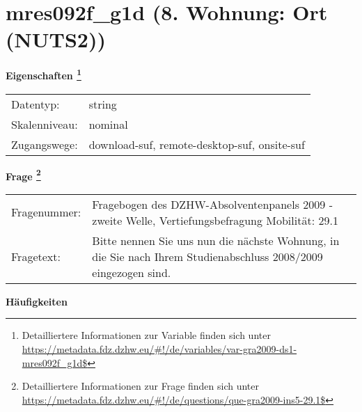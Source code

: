 
    \setcounter{footnote}{0}

    \vspace*{-1.8cm}
	\section{mres092f\_g1d (8. Wohnung: Ort (NUTS2))}
	\label{section:mres092f_g1d}



    \vspace*{0.5cm}
    \noindent\textbf{Eigenschaften
	\footnote{Detailliertere Informationen zur Variable finden sich unter
		\url{https://metadata.fdz.dzhw.eu/\#!/de/variables/var-gra2009-ds1-mres092f_g1d$}}}\\
	\begin{tabularx}{\hsize}{@{}lX}
	Datentyp: & string \\
	Skalenniveau: & nominal \\
	Zugangswege: &
	  download-suf, 
	  remote-desktop-suf, 
	  onsite-suf
 \\
    \end{tabularx}



				\vspace*{0.5cm}
                \noindent\textbf{Frage
	                \footnote{Detailliertere Informationen zur Frage finden sich unter
		              \url{https://metadata.fdz.dzhw.eu/\#!/de/questions/que-gra2009-ins5-29.1$}}}\\
				\begin{tabularx}{\hsize}{@{}lX}
					Fragenummer: &
					  Fragebogen des DZHW-Absolventenpanels 2009 - zweite Welle, Vertiefungsbefragung Mobilität:
					  29.1
 \\
					Fragetext: & Bitte nennen Sie uns nun die nächste Wohnung, in die Sie nach Ihrem Studienabschluss 2008/2009 eingezogen sind. \\
				\end{tabularx}





        		\vspace*{0.5cm}
                \noindent\textbf{Häufigkeiten}

